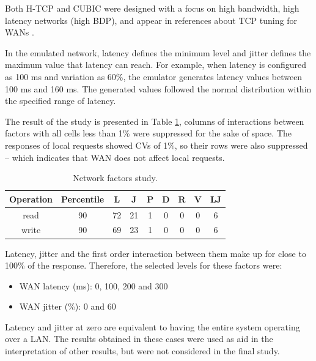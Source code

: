\documentclass[doublespacing]{bmcart}
\begin{document}
Both H-TCP and CUBIC were designed with a focus on high bandwidth, high latency
networks (high BDP), and appear in references about TCP tuning for WANs
\cite{ESnet2012}.

In the emulated network, latency defines the minimum level and jitter defines
the maximum value that latency can reach. For example, when latency is
configured as 100 ms and variation as 60\%, the emulator generates latency
values between 100 ms and 160 ms. The generated values followed the normal
distribution within the specified range of latency.

The result of the study is presented in Table
\ref{tab:estudo_para_fatores_de_rede}, columns of interactions between factors
with all cells less than 1\% were suppressed for the sake of space. The
responses of local requests showed CVs of 1\%, so their rows were also
suppressed -- which indicates that WAN does not affect local requests.

\begin{table}[h!] 
\caption{Network factors study.} \label{tab:estudo_para_fatores_de_rede}
\begin{tabular}{ccccccccc} \hline

Operation & Percentile & L & J & P & D & R & V & LJ\\\hline

read & 90 & 72 & 21 & 1 & 0 & 0 & 0 & 6\\

write & 90 & 69 & 23 & 1 & 0 & 0 & 0 & 6\\\hline

\end{tabular}

\end{table}

Latency, jitter and the first order interaction between them make up for close to 100\% of the response. Therefore, the selected levels for
these factors were:

\begin{itemize}

\item WAN latency (ms): 0, 100, 200 and 300

\item WAN jitter (\%): 0 and 60

\end{itemize}

Latency and jitter at zero are equivalent to having the entire system operating
over a LAN. The results obtained in these cases were used as aid in the
interpretation of other results, but were not considered in the final study.
\end{document}

